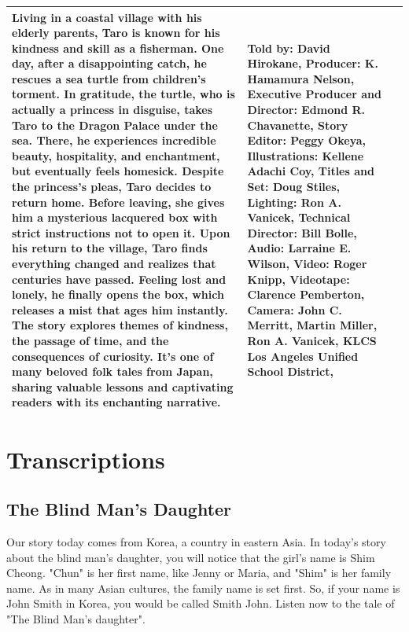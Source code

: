 \begin{table}[h]
\begin{small}
\begin{tabular}{|p{1.5cm}|p{8.5cm}|p{7cm}|}
            Living in a coastal village with his elderly parents, Taro is known for his kindness and skill as a fisherman.
            One day, after a disappointing catch, he rescues a sea turtle from children's torment.
            In gratitude, the turtle, who is actually a princess in disguise, takes Taro to the Dragon Palace under the sea.
            There, he experiences incredible beauty, hospitality, and enchantment, but eventually feels homesick.
            Despite the princess's pleas, Taro decides to return home. Before leaving, she gives him a mysterious lacquered box with strict instructions not to open it.
            Upon his return to the village, Taro finds everything changed and realizes that centuries have passed.
            Feeling lost and lonely, he finally opens the box, which releases a mist that ages him instantly.
            The story explores themes of kindness, the passage of time, and the consequences of curiosity.
            It's one of many beloved folk tales from Japan, sharing valuable lessons and captivating readers with its enchanting narrative.
                                 &
            Told by: David Hirokane,
            Producer: K. Hamamura Nelson,
            Executive Producer and Director: Edmond R. Chavanette,
            Story Editor: Peggy Okeya,
            Illustrations: Kellene Adachi Coy,
            Titles and Set: Doug Stiles,
            Lighting: Ron A. Vanicek,
            Technical Director: Bill Bolle,
            Audio: Larraine E. Wilson,
            Video: Roger Knipp,
            Videotape: Clarence Pemberton,
            Camera: John C. Merritt, Martin Miller, Ron A. Vanicek,
            KLCS Los Angeles Unified School District,
            \\
            \hline
        \end{tabular}
    \end{small}

\end{table}

\clearpage
\newpage

\section{Transcriptions}

\subsection{The Blind Man's Daughter}

Our story today comes from Korea, a country in eastern Asia. In today's story about the blind man's daughter, you will notice that the girl's name is Shim Cheong. "Chun" is her first name, like Jenny or Maria, and "Shim" is her family name. As in many Asian cultures, the family name is set first. So, if your name is John Smith in Korea, you would be called Smith John. Listen now to the tale of "The Blind Man's daughter".

